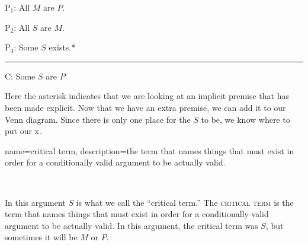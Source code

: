  \begin{earg}
\item[P$_1$:] All $M$ are $P$.
\item[P$_2$:] All $S$ are $M$.
\item[P$_3$:] Some $S$ exists.*
\vspace{-.5em}
\item [] \rule{0.2\linewidth}{.5pt} 
\item[C:] Some $S$ are $P$
\end{earg} 
 
Here the asterisk indicates that we are looking at an implicit premise that has been made explicit. Now that we have an extra premise, we can add it to our Venn diagram. Since there is only one place for the $S$ to be, we know where to put our x. \label{CVFex1}

\begin{center}
\end{center}


{
name=critical term,
description={the term that names things that must exist in order for a conditionally valid argument to be actually valid.}
}

\

In this argument $S$ is what we call the ``critical term.'' The \textsc{\gls{critical term}}\label{def:critical_term} is the term that names things that must exist in order for a conditionally valid argument to be actually valid. In this argument, the critical term was $S$, but sometimes it will be $M$ or $P$. 

